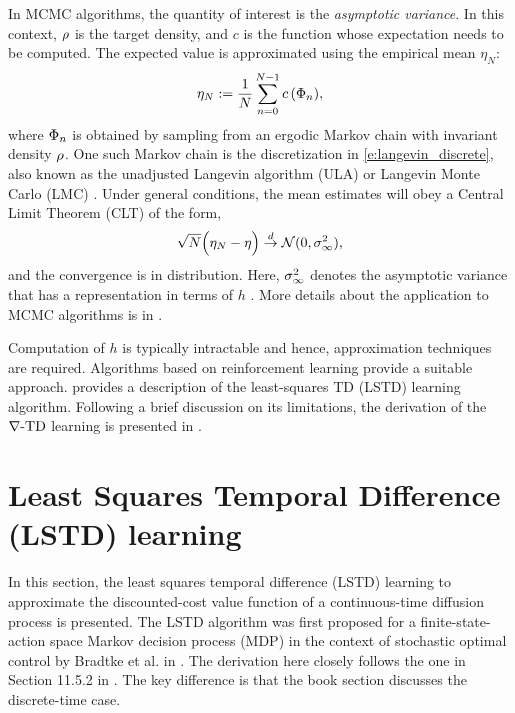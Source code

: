 In MCMC algorithms, the quantity of interest is the \textit{asymptotic variance}. In this context, $\rho$ is the target density, and $c$ is the function whose expectation needs to be computed. The expected value is approximated using the empirical mean $\eta_N$:
\begin{equation} \eta_N := \frac{1}{N} \sum_{n=0}^{N-1} c\,(\Phi_n),\end{equation}
where $\Phi_n$ is obtained by sampling from an ergodic Markov chain with invariant density $\rho$. One such Markov chain is the discretization in \eqref{e:langevin_discrete}, also known as the unadjusted Langevin algorithm (ULA) or Langevin Monte Carlo (LMC) \cite{}. Under general conditions, the mean estimates will obey a Central Limit Theorem (CLT) of the form,
\begin{equation}
\sqrt{N} \Bigl( \eta_N - \eta \Bigr) \overset{d}{\to} \mathcal{N}(0,\sigma_\infty ^2),
\end{equation}
and the convergence is in distribution. Here, $\sigma_\infty^2$ denotes the asymptotic variance that has a representation in terms of $h$ \cite{glymey96a,MT,asmgly07}. More details about the application to MCMC algorithms is in . 

Computation of $h$ is typically intractable and hence, approximation techniques are required. Algorithms based on reinforcement learning provide a suitable approach.  provides a description of the least-squares TD (LSTD) learning algorithm. Following a brief discussion on its limitations,  the derivation of the $\nabla\text{-TD}$ learning is presented in . 

\section{Least Squares Temporal Difference (LSTD) learning} 
\label{s:lstd}
In this section, the least squares temporal difference (LSTD) learning to approximate the discounted-cost value function of a continuous-time diffusion process is presented.  The LSTD algorithm was first proposed for a finite-state-action space Markov decision process (MDP) in the context of stochastic optimal control  by Bradtke et al. in \cite{brabar96}. The derivation here closely follows the one in Section 11.5.2 in \cite{ctcn}. The key difference is that the book section discusses the discrete-time case. 

